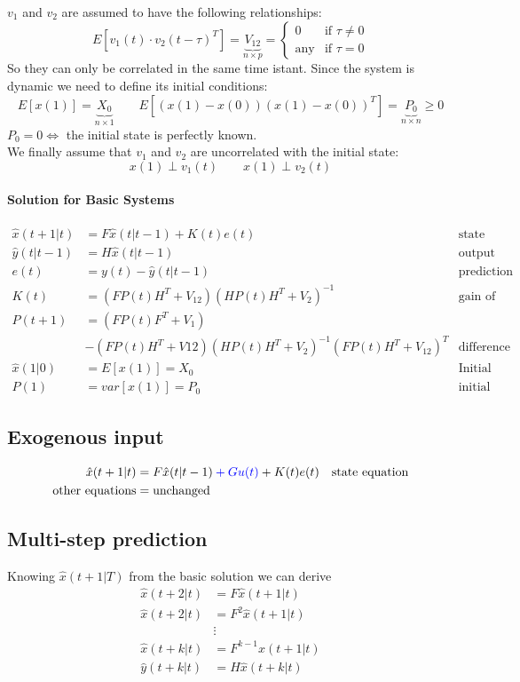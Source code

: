 \documentclass{article}
\begin{document}
$v_1$ and $v_2$ are assumed to have the following relationships:
\[
E\left[v_1(t)\cdot v_2(t-\tau)^T\right]=
\underbrace{V_{12}}_{n \times p}=
\begin{cases}
0&\text{if }\tau\neq 0\\
\text{any}&\text{if }\tau=0
\end{cases}
\]
So they can only be correlated in the same time istant. Since the system is dynamic we need to define its initial conditions:
\[
E\left[x(1)\right]=\underbrace{X_0}_{n \times 1}
\qquad
E\left[(x(1)-x(0))(x(1)-x(0))^T\right]=\underbrace{P_0}_{n\times n}\geq 0
\]
$P_0=0 \iff$ the initial state is perfectly known.\\
We finally assume that $v_1$ and $v_2$ are uncorrelated with the initial state:
\[
x(1)\perp v_1(t) 
\qquad
x(1)\perp v_2(t)
\]
\paragraph{Solution for Basic Systems}
\begin{align*}
\hat{x}(t+1|t)&=F\hat{x}(t|t-1)+K(t)e(t)&\text{state equation}\\
\hat{y}(t|t-1)&=H\hat{x}(t|t-1)&\text{output equation}\\
e(t)&=y(t)-\hat{y}(t|t-1)&\text{prediction error}\\
K(t)&=\left(FP(t)H^T+V_{12}\right)\left(HP(t)H^T+V_2\right)^{-1}&\text{gain of the KF}\\
P(t+1)&=\left(FP(t)F^T+V_1\right)\\
&-\left(FP(t)H^T+V{12}\right)\left(HP(t)H^T+V_2\right)^{-1}\left(FP(t)H^T+V_{12}\right)^T&\text{difference Riccati equation}\\
\hline
\hat{x}(1|0)&=E\left[x(1)\right]=X_0&\text{Initial state}\\
P(1)&=var\left[x(1)\right]=P_0&\text{initial DRE}
\end{align*}

\subsection{Exogenous input}
\begin{align*}
\hat{x}(t+1|t)&=F\hat{x}(t|t-1)\color{blue}+Gu(t)\color{black}+K(t)e(t)&\text{state equation}\\
\text{other equations}&=\text{unchanged}
\end{align*}
\subsection{Multi-step prediction}
Knowing $\hat{x}(t+1|T)$ from the basic solution we can derive
\begin{align*}
\hat{x}(t+2|t)&=F\hat{x}(t+1|t)\\
\hat{x}(t+2|t)&=F^2\hat{x}(t+1|t)\\
&\vdots\\
\hat{x}(t+k|t)&=F^{k-1}\hat{x}(t+1|t)\\
\hline
\hat{y}(t+k|t)&=H\hat{x}(t+k|t)
\end{align*}
\end{document}
